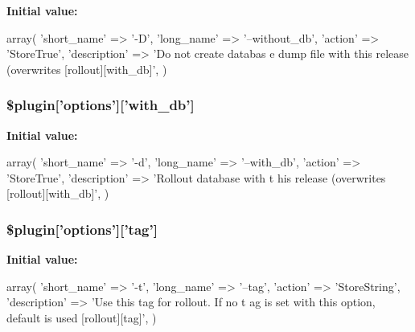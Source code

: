 \label{plugin__release-rollout_8class_8php_a86bc0259e2d95a244c343d86849a2fb4}
{\bfseries Initial value:}
\begin{DoxyCode}
 array(
                                          'short_name'  => '-D',
                                          'long_name'   => '--without_db',
                                          'action'      => 'StoreTrue',
                                          'description' => 'Do not create databas
      e dump file with this release (overwrites [rollout][with_db]',
                                        )
\end{DoxyCode}
\hypertarget{plugin__release-rollout_8class_8php_a71f19a8180c0825c53d2418ec3f1b377}{
\subsubsection[{\$plugin}]{\setlength{\rightskip}{0pt plus 5cm}\$plugin\mbox{[}'options'\mbox{]}\mbox{[}'with\_\-db'\mbox{]}}}
\label{plugin__release-rollout_8class_8php_a71f19a8180c0825c53d2418ec3f1b377}
{\bfseries Initial value:}
\begin{DoxyCode}
 array(
                                        'short_name'  => '-d',
                                        'long_name'   => '--with_db',
                                        'action'      => 'StoreTrue',
                                        'description' => 'Rollout database with t
      his release (overwrites [rollout][with_db]',
                                      )
\end{DoxyCode}
\hypertarget{plugin__release-rollout_8class_8php_aae44fd6368b379b1ef409feb8d5999ba}{
\subsubsection[{\$plugin}]{\setlength{\rightskip}{0pt plus 5cm}\$plugin\mbox{[}'options'\mbox{]}\mbox{[}'tag'\mbox{]}}}
\label{plugin__release-rollout_8class_8php_aae44fd6368b379b1ef409feb8d5999ba}
{\bfseries Initial value:}
\begin{DoxyCode}
 array(
                              'short_name'  => '-t',
                              'long_name'   => '--tag',
                              'action'      => 'StoreString',
                              'description' => 'Use this tag for rollout. If no t
      ag is set with this option, default is used [rollout][tag]',
                            )
\end{DoxyCode}
